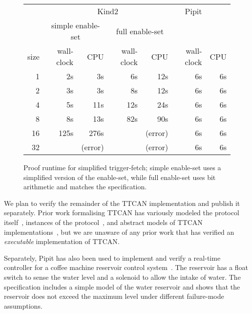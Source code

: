 \begin{figure}
\begin{tabular}{r|rr|rr|rr}
  & \multicolumn{4}{c}{Kind2} & Pipit \\
  & \multicolumn{2}{c}{simple enable-set} & \multicolumn{2}{c}{full enable-set} & \\
  size & wall-clock & CPU & wall-clock & CPU & wall-clock & CPU \\
  \hline
  1 & 2s &  3s  & 6s & 12s & 6s & 6s \\
  2 & 3s &  3s  & 8s & 12s & 6s & 6s \\
  4 & 5s & 11s  & 12s & 24s & 6s & 6s \\
  8 & 8s & 13s  & 82s & 90s & 6s & 6s \\
  16 & 125s & 276s & & (error) & 6s & 6s \\
  32 & & (error) & & (error) & 6s & 6s \\
\end{tabular}
\caption{Proof runtime for simplified trigger-fetch; simple enable-set uses a simplified version of the enable-set, while full enable-set uses bit arithmetic and matches the specification.}
\label{f:evaluation:kind2-runtime}
\end{figure}

We plan to verify the remainder of the TTCAN implementation and publish it separately.
Prior work formalising TTCAN has variously modeled the protocol itself~\cite{saha2007finite, pan2014modeling,li2018formal},
instances of the protocol~\cite{guo2020model},
and abstract models of TTCAN implementations~\cite{leen2006modeling}, but we are unaware of any prior work that has verified an \emph{executable} implementation of TTCAN.

Separately, Pipit has also been used to implement and verify a real-time controller for a coffee machine reservoir control system~\cite{robinson2023pipit}.
The reservoir has a float switch to sense the water level and a solenoid to allow the intake of water.
The specification includes a simple model of the water reservoir and shows that the reservoir does not exceed the maximum level under different failure-mode assumptions.
